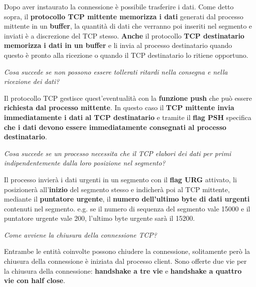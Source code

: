 \documentclass[11pt,a4paper]{article}
\theoremstyle{definition}
\begin{document}
Dopo aver instaurato la connessione è possibile trasferire i dati. Come detto sopra, il \textbf{protocollo TCP mittente memorizza i dati} generati dal processo mittente in un \textbf{buffer}, la quantità di dati che verranno poi inseriti nel segmento e inviati è a discrezione del TCP stesso. \textbf{Anche} il protocollo \textbf{TCP destinatario memorizza i dati in un buffer} e li invia al processo destinatario quando questo è pronto alla ricezione o quando il TCP destinatario lo ritiene opportuno. \begin{flushleft}
	\textit{Cosa succede se non possono essere tollerati ritardi nella consegna e nella ricezione dei dati?}
\end{flushleft}
Il protocollo TCP gestisce quest'eventualità con la \textbf{funzione push} che può essere \textbf{richiesta dal processo mittente}. In questo caso il \textbf{TCP mittente invia immediatamente i dati al TCP destinatario} e tramite il \textbf{flag PSH} specifica \textbf{che i dati devono essere immediatamente consegnati al processo destinatario}.
\begin{flushleft}
	\textit{Cosa succede se un processo necessita che il TCP elabori dei dati per primi indipendentemente dalla loro posizione nel segmento?}
\end{flushleft}
Il processo invierà i dati urgenti in un segmento con il \textbf{flag URG} attivato, li posizionerà all'\textbf{inizio} del segmento stesso e indicherà poi al TCP mittente, mediante il \textbf{puntatore urgente}, il \textbf{numero dell'ultimo byte di dati urgenti} contenuti nel segmento. e.g. se il numero di sequenza del segmento vale 15000 e il puntatore urgente vale 200, l'ultimo byte urgente sarà il 15200.
\newpage
\begin{flushleft}
	\textit{Come avviene la chiusura della connessione TCP?}
\end{flushleft}
Entrambe le entità coinvolte possono chiudere la connessione, solitamente però la chiusura della connessione è iniziata dal processo client. Sono offerte due vie per la chiusura della connessione: \textbf{handshake a tre vie} e \textbf{handshake a quattro vie con half close}.
\end{document}
